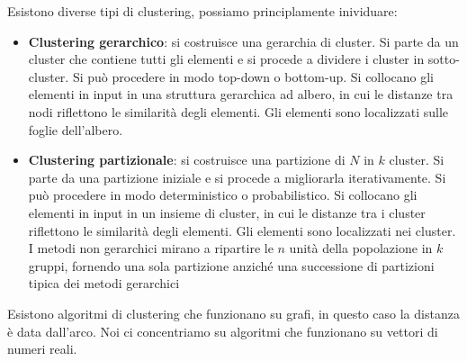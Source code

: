 Esistono diverse tipi di clustering, possiamo principlamente inividuare:
\begin{itemize}
    \item \textbf{Clustering gerarchico}: si costruisce una gerarchia di cluster.
          Si parte da un cluster che contiene tutti gli elementi e si procede a dividere
          i cluster in sotto-cluster. Si può procedere in modo top-down o bottom-up. Si
          collocano gli elementi in input in una struttura gerarchica ad albero, in cui
          le distanze tra nodi riflettono le similarità degli elementi. Gli
          elementi sono localizzati sulle foglie dell'albero.
    \item \textbf{Clustering partizionale}: si costruisce una partizione di $N$
          in $k$ cluster. Si parte da una partizione iniziale e si procede a migliorarla
          iterativamente. Si può procedere in modo deterministico o probabilistico.
          Si collocano gli elementi in input in un insieme di cluster, in cui le
          distanze tra i cluster riflettono le similarità degli elementi. Gli elementi
          sono localizzati nei cluster. I metodi non gerarchici mirano a ripartire le
          $n$ unità della popolazione in $k$ gruppi, fornendo una sola partizione anziché
          una successione di partizioni tipica dei metodi gerarchici
\end{itemize}
Esistono algoritmi di clustering che funzionano su grafi, in questo caso la distanza
è data dall'arco. Noi ci concentriamo su algoritmi che funzionano su vettori di
numeri reali.
